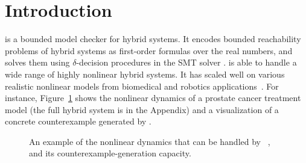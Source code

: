 \section{Introduction}\label{sec:intro}


\dReach{} is a bounded model checker for hybrid systems. It encodes
bounded reachability problems of hybrid systems as first-order
formulas over the real numbers, and solves them using
$\delta$-decision procedures in the SMT solver \dReal{}. \dReach{} is
able to handle a wide range of highly nonlinear hybrid systems. It has
scaled well on various realistic nonlinear models from biomedical and
robotics applications~\cite{}. For instance, Figure~\ref{fig:prostate-example} 
shows the nonlinear dynamics of a prostate cancer treatment model (the full hybrid system is 
in the Appendix) and a visualization of a concrete counterexample generated by \dReach{}. 
\begin{figure}[!h]
  \hfill
  \caption{An example of the nonlinear dynamics that can be handled by ~\dReach{}, and its counterexample-generation capacity.}
  \label{fig:prostate-example}
\end{figure}

